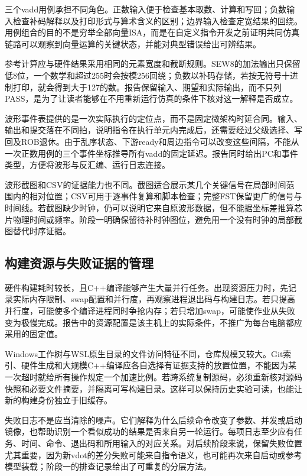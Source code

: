三个vadd用例承担不同角色。正数输入便于检查基本取数、计算和写回；负数输入检查补码解释以及打印形式与算术含义的区别；边界输入检查定宽结果的回绕。用例组合的目的不是穷举全部向量ISA，而是在自定义指令开发之前证明共同仿真链路可以观察到向量运算的关键状态，并能对典型错误给出可辨结果。\par


参考计算应与硬件结果采用相同的元素宽度和截断规则。SEW8的加法输出只保留低8位，一个数学和超过255时会按模256回绕；负数以补码存储，若按无符号十进制打印，就会得到大于127的数。报告保留输入、期望和实际输出，而不只列PASS，是为了让读者能够在不用重新运行仿真的条件下核对这一解释是否成立。\par


波形事件表提供的是一次实际执行的定位点，而不是固定微架构时延合同。输入、输出和提交落在不同拍，说明指令在执行单元内完成后，还需要经过父级选择、写回及ROB退休。由于乱序状态、下游ready和周边指令可以改变这些间隔，不能从一次正数用例的三个事件坐标推导所有vadd的固定延迟。报告同时给出PC和事件类型，方便将波形与反汇编、运行日志连接。\par


波形截图和CSV的证据能力也不同。截图适合展示某几个关键信号在局部时间范围内的相对位置；CSV可用于逐事件复算和脚本检查；完整FST保留更广的信号与时间线。若截图缺少时钟，仍可以说明它来自原波形数据，但不能据坐标差推算芯片物理时间或频率。阶段一明确保留待补时钟图位，避免用一个没有时钟的局部截图替代时序证据。\par


\subsection{构建资源与失败证据的管理}


硬件构建耗时较长，且C++编译能够产生大量并行任务。出现资源压力时，先记录实际内存限制、swap配置和并行度，再观察进程退出码与构建日志。若只提高并行度，可能使多个编译进程同时争抢内存；若只增加swap，可能使作业从失败变为极慢完成。报告中的资源配置是该主机上的实际条件，不推广为每台电脑都应采用的固定值。\par


Windows工作树与WSL原生目录的文件访问特征不同，仓库规模又较大。Git索引、硬件生成和大规模C++编译应各自选择有证据支持的放置位置，不能因为某一次超时就给所有操作规定一个加速比例。若跨系统复制源码，必须重新核对源码快照和必要文件摘要，并隔离可写构建目录。这样可以保持历史实验可读，也能让新的构建身份独立于旧缓存。\par


失败日志不是应当清除的噪声。它们解释为什么后续命令改变了参数、并发或启动镜像，也帮助识别一个看似成功的结果是否来自另一轮运行。每项日志至少应有任务、时间、命令、退出码和所用输入的对应关系。对后续阶段来说，保留失败位置尤其重要，因为新vdot的差分失败可能来自指令语义，也可能再次来自启动或参考模型装载；阶段一的排查记录给出了可重复的分层方法。\par


